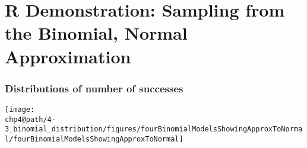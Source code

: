 \documentclass[slidestop,compress,mathserif]{beamer}
\makeatletter
\def\chp4@path{../../Chp 4}
\makeatother
\begin{document}

\section{R Demonstration: Sampling from the Binomial, Normal Approximation}








\begin{frame}
\frametitle{Distributions of number of successes}


\begin{center}
\texttt{[image: \\chp4@path/4-3\_binomial\_distribution/figures/fourBinomialModelsShowingApproxToNormal/fourBinomialModelsShowingApproxToNormal]}
\end{center}

\end{frame}
\end{document}
